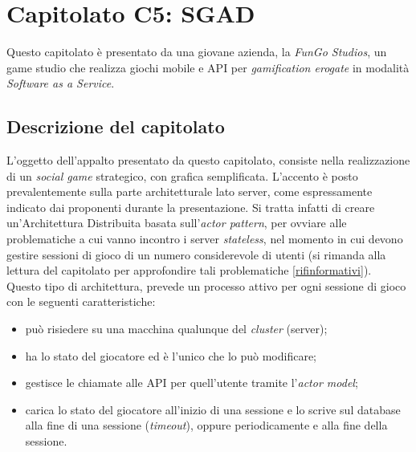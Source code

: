 \section{Capitolato C5: SGAD}
\label{capitolato5}
Questo capitolato è presentato da una giovane azienda, la \textit{FunGo Studios}, un game studio che realizza giochi mobile e API\glossario{} per \textit{gamification erogate} in modalità \textit{Software as a Service}.

\subsection{Descrizione del capitolato}
\label{descrizionecap5}
L'oggetto dell'appalto presentato da questo capitolato, consiste nella realizzazione di un \textit{social game} strategico, con grafica semplificata. L'accento è posto prevalentemente sulla parte architetturale lato server, come espressamente indicato dai proponenti durante la presentazione. Si tratta infatti di creare un'Architettura Distribuita basata sull'\textit{actor pattern}, per ovviare alle problematiche a cui vanno incontro i server \textit{stateless}, nel momento in cui devono gestire sessioni di gioco di un numero considerevole di utenti (si rimanda alla lettura del capitolato per approfondire tali problematiche \ref{rifinformativi}).
\\Questo tipo di architettura, prevede un processo attivo per ogni sessione di gioco con le seguenti caratteristiche:
\begin{itemize}
\item può risiedere su una macchina qualunque del \textit{cluster} (server);
\item ha lo stato del giocatore ed è l'unico che lo può modificare;
\item gestisce le chiamate alle API\glossario{} per quell'utente tramite l'\textit{actor model};
\item carica lo stato del giocatore all'inizio di una sessione e lo scrive sul database alla fine di una sessione (\textit{timeout}), oppure periodicamente e alla fine della sessione.
\end{itemize}

